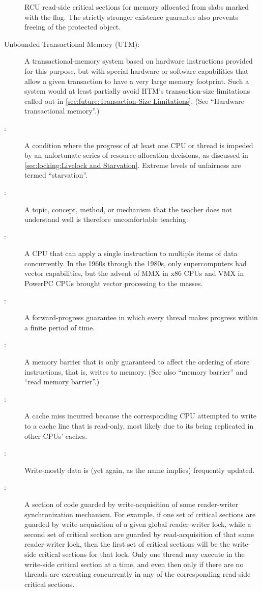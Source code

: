 \begin{description}
	RCU read-side critical sections for memory allocated from slabs
	marked with the  flag.
	The strictly stronger existence guarantee also prevents freeing
	of the protected object.
\item[Unbounded Transactional Memory (UTM):]
	A transactional-memory system based on hardware instructions
	provided for this purpose, but with special hardware or
	software capabilities that allow a given transaction to
	have a very large memory footprint.
	Such a system would at least partially avoid
	HTM's transaction-size limitations called out in
	\cref{sec:future:Transaction-Size Limitations}.
	(See ``Hardware transactional memory''.)
\item[\IXG{Unfairness}:]
	A condition where the progress of at least one CPU or thread
	is impeded by an unfortunate series of resource-allocation
	decisions, as discussed in
	\cref{sec:locking:Livelock and Starvation}.
	Extreme levels of unfairness are termed ``starvation''.
\item[\IXG{Unteachable}:]
	A topic, concept, method, or mechanism that the teacher does
	not understand well is therefore uncomfortable teaching.
\item[\IXGr{Vector CPU}:]
	A CPU that can apply a single instruction to multiple items of
	data concurrently.
	In the 1960s through the 1980s, only supercomputers had vector
	capabilities, but the advent of MMX in x86 CPUs and VMX in
	PowerPC CPUs brought vector processing to the masses.
\item[\IXG{Wait Free}:]
	A forward-progress guarantee in which every thread makes
	progress within a finite period of time.
\item[\IXGh{Write}{Memory Barrier}:]
	A memory barrier that is only guaranteed to affect the ordering
	of store instructions, that is, writes to memory.
	(See also ``memory barrier'' and ``read memory barrier''.)
\item[\IXGalth{Write Miss}{write}{cache miss}:]
	A cache miss incurred because the corresponding CPU attempted
	to write to a cache line that is read-only, most likely due
	to its being replicated in other CPUs' caches.
\item[\IXG{Write Mostly}:]
	Write-mostly data is (yet again, as the name implies) frequently
	updated.
\item[\IXGh{Write-Side}{Critical Section}:]
	A section of code guarded by write-acquisition of
	some reader-writer synchronization mechanism.
	For example, if one set of critical sections are guarded by
	write-acquisition of
	a given global reader-writer lock, while a second set of critical
	section are guarded by read-acquisition of that same reader-writer
	lock, then the first set of critical sections will be the
	write-side critical sections for that lock.
	Only one thread may execute in the write-side critical section
	at a time, and even then only if there are no threads are
	executing concurrently in any of the corresponding read-side
	critical sections.
\end{description}
